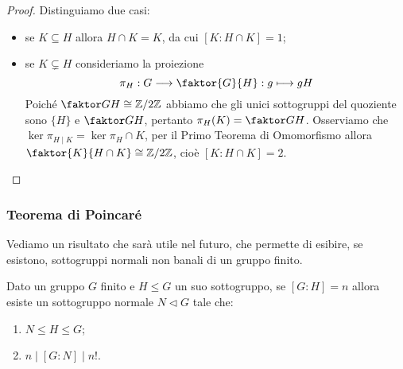 \documentclass[11pt]{scrartcl}
\begin{document}
\begin{proof}
    Distinguiamo due casi:
    \begin{itemize}
        \item se $K \subseteq H$ allora $H \cap K = K$, da cui $[K:H\cap K] = 1$;
        \item se $K \subsetneq H$ consideriamo la proiezione 
        \[
            \pi_H: G\longrightarrow \faktor{G}{H} :g \longmapsto gH
        \]
        Poiché $\faktor G H \cong \Z2$ abbiamo che gli unici sottogruppi 
        del quoziente sono $\{H\}$ e $\faktor G H$, pertanto 
        $\pi_H(K) = \faktor G H$. Osserviamo che $\ker\pi_{H\mid K}
        = \ker \pi_H \cap K$, per il Primo Teorema di Omomorfismo allora 
        $\faktor{K}{H\cap K} \cong \Z2$, cioè $[K:H\cap K] = 2$.
    \end{itemize}
\end{proof}

\subsubsection{Teorema di Poincaré}

Vediamo un risultato che sarà utile nel futuro, che permette di esibire,
se esistono, sottogruppi normali non banali di un gruppo finito.

\begin{theorem}
    \label{teorema3.0}
    Dato un gruppo $G$ finito e $H\leqslant G$ un suo sottogruppo, 
    se $[G:H] = n$ allora esiste un sottogruppo normale $N\triangleleft G$ 
    tale che:
    \begin{enumerate}[(1)]
        \item $N\leqslant H \leqslant G$;
        \item $n \mid [G:N] \mid n!$.
    \end{enumerate}
\end{theorem}
\end{document}
